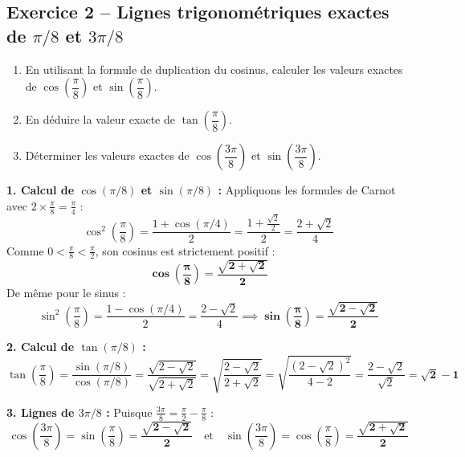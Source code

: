 \documentclass[11pt,a4paper]{article}
\begin{document}
\vspace{0.3cm}

\subsection*{Exercice 2 -- Lignes trigonométriques exactes de $\pi/8$ et $3\pi/8$}

\begin{enumerate}[label=\arabic*.]
    \item En utilisant la formule de duplication du cosinus, calculer les valeurs exactes de $\cos\left(\dfrac{\pi}{8}\right)$ et $\sin\left(\dfrac{\pi}{8}\right)$.
    \item En déduire la valeur exacte de $\tan\left(\dfrac{\pi}{8}\right)$.
    \item Déterminer les valeurs exactes de $\cos\left(\dfrac{3\pi}{8}\right)$ et $\sin\left(\dfrac{3\pi}{8}\right)$.
\end{enumerate}

\begin{correctionbox}
\textbf{1. Calcul de $\cos(\pi/8)$ et $\sin(\pi/8)$ :}
Appliquons les formules de Carnot avec $2 \times \frac{\pi}{8} = \frac{\pi}{4}$ :
\[
\cos^2\left(\frac{\pi}{8}\right) = \frac{1 + \cos(\pi/4)}{2} = \frac{1 + \frac{\sqrt{2}}{2}}{2} = \frac{2 + \sqrt{2}}{4}
\]
Comme $0 < \frac{\pi}{8} < \frac{\pi}{2}$, son cosinus est strictement positif :
\[
\mathbf{\cos\left(\frac{\pi}{8}\right) = \frac{\sqrt{2 + \sqrt{2}}}{2}}
\]
De même pour le sinus :
\[
\sin^2\left(\frac{\pi}{8}\right) = \frac{1 - \cos(\pi/4)}{2} = \frac{2 - \sqrt{2}}{4} \implies \mathbf{\sin\left(\frac{\pi}{8}\right) = \frac{\sqrt{2 - \sqrt{2}}}{2}}
\]

\textbf{2. Calcul de $\tan(\pi/8)$ :}
\[
\tan\left(\frac{\pi}{8}\right) = \frac{\sin(\pi/8)}{\cos(\pi/8)} = \frac{\sqrt{2 - \sqrt{2}}}{\sqrt{2 + \sqrt{2}}} = \sqrt{\frac{2 - \sqrt{2}}{2 + \sqrt{2}}} = \sqrt{\frac{(2 - \sqrt{2})^2}{4 - 2}} = \frac{2 - \sqrt{2}}{\sqrt{2}} = \mathbf{\sqrt{2} - 1}
\]

\textbf{3. Lignes de $3\pi/8$ :}
Puisque $\frac{3\pi}{8} = \frac{\pi}{2} - \frac{\pi}{8}$ :
\[
\cos\left(\frac{3\pi}{8}\right) = \sin\left(\frac{\pi}{8}\right) = \mathbf{\frac{\sqrt{2 - \sqrt{2}}}{2}} \quad \text{et} \quad \sin\left(\frac{3\pi}{8}\right) = \cos\left(\frac{\pi}{8}\right) = \mathbf{\frac{\sqrt{2 + \sqrt{2}}}{2}}
\]
\end{correctionbox}
\end{document}
